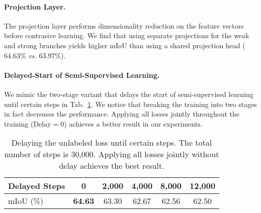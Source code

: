 \paragraph{Projection Layer.}
The projection layer performs dimensionality reduction on the feature vectors before contrasive learning. We find that using separate projections for the weak and strong branches yields higher mIoU than using a shared projection head ($64.63\%$ \emph{vs.} $63.97\%$).


\paragraph{Delayed-Start of Semi-Supervised Learning.}
We mimic the two-stage variant that delays the start of semi-supervised learning until certain steps in Tab.~\ref{tab:abl/delay}. We notice that breaking the training into two stages in fact decreases the performance. Applying all losses jointly throughout the training ($\text{Delay}=0$) achieves a better result in our experiments.

\begin{table}[tb]
    \small
    \centering
    \caption{Delaying the unlabeled loss until certain steps. The total number of steps is 30,000. Applying all losses jointly without delay achieves the best result.}
    \label{tab:abl/delay}
\setlength{\tabcolsep}{6.5pt}
    \begin{tabular}{lccccc}
    \toprule
    Delayed Steps  & 0  & 2,000  & 4,000 & 8,000 & 12,000 \\
    \midrule
    mIoU (\%)   & \textbf{64.63}  & 63.30 & 62.67 & 62.56 & 62.50 \\
    \bottomrule
    \end{tabular}
    \vspace{-10pt}
\end{table}
